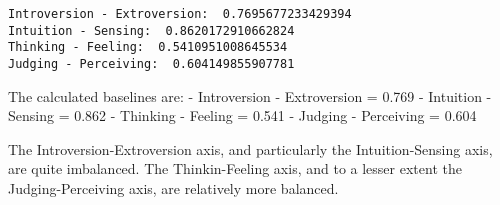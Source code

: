 \documentclass[11pt]{article}
\begin{document}
    \begin{Verbatim}[commandchars=\\\{\}]
Introversion - Extroversion:  0.7695677233429394
Intuition - Sensing:  0.8620172910662824
Thinking - Feeling:  0.5410951008645534
Judging - Perceiving:  0.604149855907781

    \end{Verbatim}

    The calculated baselines are: - Introversion - Extroversion = 0.769 -
Intuition - Sensing = 0.862 - Thinking - Feeling = 0.541 - Judging -
Perceiving = 0.604

The Introversion-Extroversion axis, and particularly the
Intuition-Sensing axis, are quite imbalanced. The Thinkin-Feeling axis,
and to a lesser extent the Judging-Perceiving axis, are relatively more
balanced.
\end{document}
